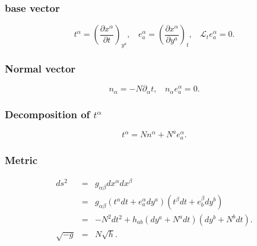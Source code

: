\subsubsection{base vector}
\[t^{\alpha} = \left( \frac{\partial x^{\alpha}}{\partial t}\right)_{y^a}, \ \ \ \ e_a^{\alpha} = \left(\frac{\partial x^{\alpha}}{\partial y^a} \right)_t, \ \ \ \ \mathcal{L}_t e_a^{\alpha} = 0.\]
\subsubsection{Normal vector}
\[n_{\alpha} = -N \partial_{\alpha}t, \ \ \ \ n_{\alpha} e_a^{\alpha} = 0.\]
\subsubsection{Decomposition of $t^{\alpha}$}
\[t^{\alpha} = N n^{\alpha} + N^a e_a^{\alpha}.\]
\subsubsection{Metric}
\begin{eqnarray}
ds^2 &=& g_{\alpha \beta} dx^{\alpha} dx^{\beta} \nonumber \\
&=& g_{\alpha \beta} (t^{\alpha} dt + e_a^{\alpha}dy^a) (t^{\beta} dt + e_b^{\beta}dy^{b}) \nonumber \\
&=& -N^2 dt^2 + h_{ab}(dy^a+N^a dt)(dy^b + N^b dt). \nonumber \\
\sqrt{-g} &=& N \sqrt{h}. \nonumber
\end{eqnarray}

